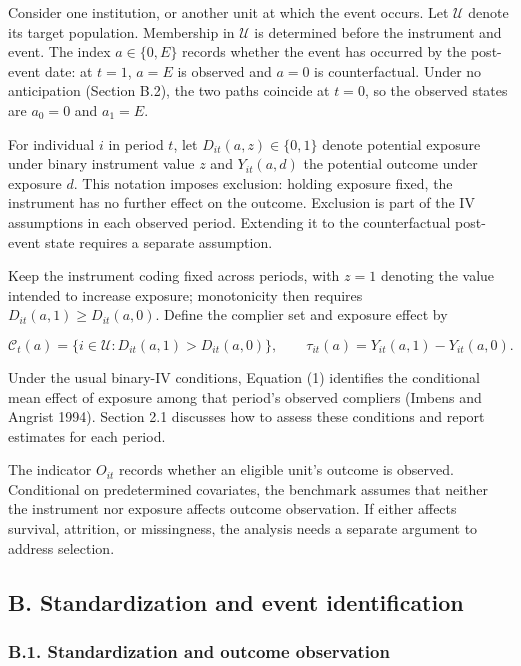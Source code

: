 \documentclass[
  11pt,
]{article}
\begin{document}
Consider one institution, or another unit at which the event occurs. Let
\(\mathcal U\) denote its target population. Membership in
\(\mathcal U\) is determined before the instrument and event. The index
\(a\in\{0,E\}\) records whether the event has occurred by the post-event
date: at \(t=1\), \(a=E\) is observed and \(a=0\) is counterfactual.
Under no anticipation (Section B.2), the two paths coincide at \(t=0\),
so the observed states are \(a_0=0\) and \(a_1=E\).

For individual \(i\) in period \(t\), let \(D_{it}(a,z)\in\{0,1\}\)
denote potential exposure under binary instrument value \(z\) and
\(Y_{it}(a,d)\) the potential outcome under exposure \(d\). This
notation imposes exclusion: holding exposure fixed, the instrument has
no further effect on the outcome. Exclusion is part of the IV
assumptions in each observed period. Extending it to the counterfactual
post-event state requires a separate assumption.

Keep the instrument coding fixed across periods, with \(z=1\) denoting
the value intended to increase exposure; monotonicity then requires
\(D_{it}(a,1)\geq D_{it}(a,0)\). Define the complier set and exposure
effect by

\[
\mathcal C_t(a)=\{i\in\mathcal U:D_{it}(a,1)>D_{it}(a,0)\},
\qquad
\tau_{it}(a)=Y_{it}(a,1)-Y_{it}(a,0).
\tag{S.1}
\]

Under the usual binary-IV conditions, Equation (1) identifies the
conditional mean effect of exposure among that period's observed
compliers (Imbens and Angrist 1994). Section 2.1 discusses how to assess
these conditions and report estimates for each period.

The indicator \(O_{it}\) records whether an eligible unit's outcome is
observed. Conditional on predetermined covariates, the benchmark assumes
that neither the instrument nor exposure affects outcome observation. If
either affects survival, attrition, or missingness, the analysis needs a
separate argument to address selection.

\hypertarget{b.-standardization-and-event-identification}{%
\subsection{B. Standardization and event
identification}\label{b.-standardization-and-event-identification}}

\hypertarget{b.1.-standardization-and-outcome-observation}{%
\subsubsection{B.1. Standardization and outcome
observation}\label{b.1.-standardization-and-outcome-observation}}
\end{document}
